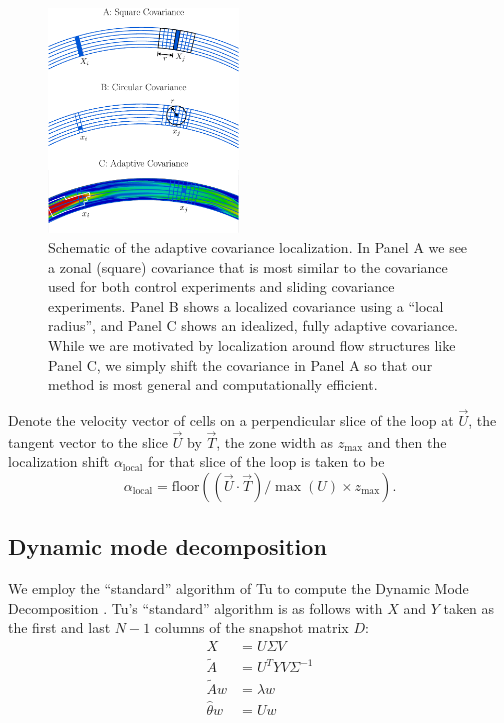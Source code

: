 \begin{figure}[h]
  \centering
  \includegraphics[width=0.45\textwidth]{figures/covariance-localization-schematic-labeled-004.pdf}
  \caption[]{
    Schematic of the adaptive covariance localization.
    In Panel A we see a zonal (square) covariance that is most similar to the covariance used for both control experiments and sliding covariance experiments.
    Panel B shows a localized covariance using a ``local radius'', and Panel C shows an idealized, fully adaptive covariance.
    While we are motivated by localization around flow structures like Panel C, we simply shift the covariance in Panel A so that our method is most general and computationally efficient.
  }
  \label{fig:covariance-localization-schematic}
\end{figure}

Denote the velocity vector of cells on a perpendicular slice of the loop at $\vec{U}$, the tangent vector to the slice $\vec{U}$ by $\vec{T}$, the zone width as $z_{\text{max}}$ and then the localization shift $\alpha_{\text{local}}$ for that slice of the loop is taken to be
\begin{equation} \alpha_{\text{local}} = \text{floor} \left( (\vec{U} \cdot \vec{T})/\max (U) \times z_{\text{max}} \right) . \end{equation}

\subsection{Dynamic mode decomposition}

We employ the ``standard'' algorithm of Tu to compute the Dynamic Mode Decomposition \cite{tu2013dynamic}.
Tu's ``standard'' algorithm is as follows with $X$ and $Y$ taken as the first and last $N-1$ columns of the snapshot matrix $D$:
\begin{align*} X &= U\Sigma V \tag*{(Take SVD of $X$.)}\\
  \tilde{A} &= U^T Y V \Sigma ^{-1} \tag*{(Build the $A$ matrix.)}\\
  \tilde{A}w &= \lambda w \tag*{(Compute eigenvectors and values.)}\\
  \hat{\theta}w &= U w \tag*{(Compute corresponding modes.)}\end{align*}

